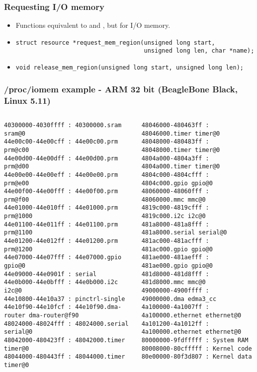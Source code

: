 \begin{frame}[fragile]
  \frametitle{Requesting I/O memory}
  \begin{itemize}
  \item Functions equivalent to  and
    , but for I/O memory.
  \item
\begin{verbatim}
struct resource *request_mem_region(unsigned long start,
                                    unsigned long len, char *name);
\end{verbatim}
  \item
\begin{verbatim}
void release_mem_region(unsigned long start, unsigned long len);
  \end{verbatim}
\end{itemize}
\end{frame}

\begin{frame}[fragile]
  \frametitle{/proc/iomem example - ARM 32 bit (BeagleBone Black, Linux 5.11)}
  \tiny
  \begin{columns}
  \begin{verbatim}
40300000-4030ffff : 40300000.sram sram@0
44e00c00-44e00cff : 44e00c00.prm prm@c00
44e00d00-44e00dff : 44e00d00.prm prm@d00
44e00e00-44e00eff : 44e00e00.prm prm@e00
44e00f00-44e00fff : 44e00f00.prm prm@f00
44e01000-44e010ff : 44e01000.prm prm@1000
44e01100-44e011ff : 44e01100.prm prm@1100
44e01200-44e012ff : 44e01200.prm prm@1200
44e07000-44e07fff : 44e07000.gpio gpio@0
44e09000-44e0901f : serial
44e0b000-44e0bfff : 44e0b000.i2c i2c@0
44e10800-44e10a37 : pinctrl-single
44e10f90-44e10fcf : 44e10f90.dma-router dma-router@f90
48024000-48024fff : 48024000.serial serial@0
48042000-480423ff : 48042000.timer timer@0
48044000-480443ff : 48044000.timer timer@0
\end{verbatim}
  \begin{verbatim}
48046000-480463ff : 48046000.timer timer@0
48048000-480483ff : 48048000.timer timer@0
4804a000-4804a3ff : 4804a000.timer timer@0
4804c000-4804cfff : 4804c000.gpio gpio@0
48060000-48060fff : 48060000.mmc mmc@0
4819c000-4819cfff : 4819c000.i2c i2c@0
481a8000-481a8fff : 481a8000.serial serial@0
481ac000-481acfff : 481ac000.gpio gpio@0
481ae000-481aefff : 481ae000.gpio gpio@0
481d8000-481d8fff : 481d8000.mmc mmc@0
49000000-4900ffff : 49000000.dma edma3_cc
4a100000-4a1007ff : 4a100000.ethernet ethernet@0
4a101200-4a1012ff : 4a100000.ethernet ethernet@0
80000000-9fdfffff : System RAM
80008000-80cfffff : Kernel code
80e00000-80f3d807 : Kernel data
\end{verbatim}
  \end{columns}
\end{frame}

